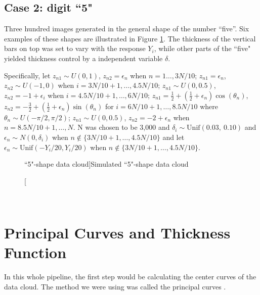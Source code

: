 \documentclass[12pt]{article}
\begin{document}
\subsection{Case 2: digit ``5"}
Three hundred images generated in the general shape of the number ``five''. Six examples of these shapes are illustrated in Figure \ref{fig.fiveshape}. The thickness of the vertical bars on top was set to vary with the response $Y_i$, while other parts of the ``five" yielded thickness control by a independent variable $\delta$.\

Specifically, let $z_{n1}\sim U(0,1)$, $z_{n2}=\epsilon_n$ when $n=1\dots,3N/10$; $z_{n1}=\epsilon_n$, $z_{n2}\sim U(-1,0)$ when $i=3N/10+1,\dots,4.5N/10$; $z_{n1}\sim U(0,0.5)$, $z_{n2}=-1+\epsilon_i$ when $i=4.5N/10+1,\dots,6N/10$; $z_{n1}=\frac{1}{2}+(\frac{1}{2}+\epsilon_n)\cos(\theta_n)$, $z_{n2}=-\frac{3}{2}+(\frac{1}{2}+\epsilon_n)\sin(\theta_n)$ for $i=6N/10+1,\dots,8.5N/10$ where $\theta_n\sim U(-\pi/2,\pi/2)$; $z_{n1}\sim U(0,0.5)$, $z_{n2}=-2+\epsilon_n$ when $n=8.5N/10+1,\dots,N$. N was chosen to be 3,000 and $\delta_i\sim \text{Unif}(0.03,\ 0.10)$ and $\epsilon_n\sim N(0, \delta_i)$ when $n\notin \{3N/10+1,\dots,4.5N/10\}$ and let $\epsilon_n\sim \text{Unif}(-Y_i/20,Y_i/20)$ when $n\notin \{3N/10+1,\dots,4.5N/10\}$.\


\begin{figure}[H]
\caption[``5"-shape data cloud]{\footnotesize Simulated ``5"-shape data cloud}
\label{fig.fiveshape}
\begin{minipage}[b]{1\linewidth}
\centering
{}
\end{minipage}
\end{figure}\

\section{Principal Curves and Thickness Function}
In this whole pipeline, the first step would be calculating the center curves of the data cloud. The method we were using was called the principal curves \cite{hastie1989principal}.
\end{document}
